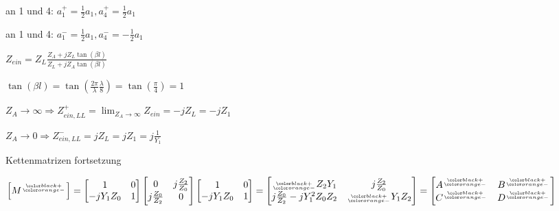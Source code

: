 \begin{pitemize}
    \item {}
    \begin{pitemize}
        \item \cp  an 1 und 4: $a_1^+ = \frac{1}{2}a_1, a_4^+ = \frac{1}{2}a_1$ 
        \item {}
    \end{pitemize}
    \item {}
    \begin{pitemize}
        \item \cm  an 1 und 4: $a_1^- = \frac{1}{2}a_1, a_4^- = -\frac{1}{2}a_1$
        \item {}
    \end{pitemize}
\end{pitemize}


\begin{pitemize}
    \item $Z_{ein} = Z_L \frac{Z_A + jZ_L \tan(\beta l)}{Z_L + jZ_A \tan(\beta l)}$
    \item $\tan(\beta l) = \tan(\frac{2\pi}{\lambda} \frac{\lambda}{8}) = \tan(\frac{\pi}{4}) = 1$
    \item \cp $Z_A \rightarrow \infty \Rightarrow Z_{ein,LL}^+ = \lim_{Z_A \rightarrow \infty}\limits Z_{ein} = -jZ_L = -jZ_1$
    \item \cm $Z_A \rightarrow 0 \Rightarrow Z_{ein,LL}^- = jZ_L = jZ_1 = j\frac{1}{Y_1}$
\end{pitemize}

Kettenmatrizen fortsetzung

$\left[M^\ggt{+}{-}\right] = \begin{bmatrix}
    1 & 0 \\ -jY_1Z_0 & 1
\end{bmatrix}\begin{bmatrix}
    0 & j\frac{Z_2}{Z_0} \\ j\frac{Z_0}{Z_2} & 0
\end{bmatrix}\begin{bmatrix}
    1 & 0 \\ -jY_1Z_0 & 1
\end{bmatrix}
= \begin{bmatrix}
    \ggt{+}{-}Z_2Y_1 & j \frac{Z_2}{Z_0}\\ j\frac{Z_0}{Z_2} - jY_1^2Z_0Z_2 & \ggt{+}{-}Y_1Z_2
\end{bmatrix} = \begin{bmatrix}
    A^\ggt{+}{-} & B^\ggt{+}{-} \\ C^\ggt{+}{-} & D^\ggt{+}{-}
\end{bmatrix}$

